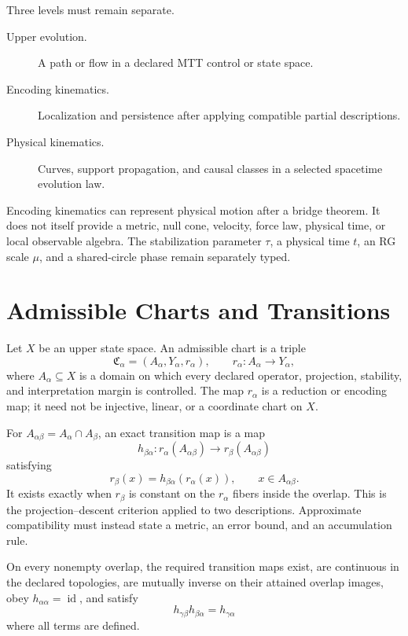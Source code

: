 \documentclass[11pt]{article}
\begin{document}
Three levels must remain separate.
\begin{description}
\item[Upper evolution.] A path or flow in a declared MTT control or state
space.
\item[Encoding kinematics.] Localization and persistence after applying
compatible partial descriptions.
\item[Physical kinematics.] Curves, support propagation, and causal classes
in a selected spacetime evolution law.
\end{description}

Encoding kinematics can represent physical motion after a bridge theorem. It
does not itself provide a metric, null cone, velocity, force law, physical
time, or local observable algebra. The stabilization parameter $\tau$, a
physical time $t$, an RG scale $\mu$, and a shared-circle phase remain
separately typed.

\section{Admissible Charts and Transitions}

Let $X$ be an upper state space. An admissible chart is a triple
\[
 \mathfrak C_\alpha=(A_\alpha,Y_\alpha,r_\alpha),
 \qquad r_\alpha:A_\alpha\longrightarrow Y_\alpha,
\]
where $A_\alpha\subseteq X$ is a domain on which every declared operator,
projection, stability, and interpretation margin is controlled. The map
$r_\alpha$ is a reduction or encoding map; it need not be injective, linear,
or a coordinate chart on $X$.

For $A_{\alpha\beta}=A_\alpha\cap A_\beta$, an exact transition map is a map
\[
 h_{\beta\alpha}:
 r_\alpha(A_{\alpha\beta})\longrightarrow r_\beta(A_{\alpha\beta})
\]
satisfying
\[
 r_\beta(x)=h_{\beta\alpha}(r_\alpha(x)),
 \qquad x\in A_{\alpha\beta}.
\]
It exists exactly when $r_\beta$ is constant on the $r_\alpha$ fibers inside
the overlap. This is the projection--descent criterion applied to two
descriptions. Approximate compatibility must instead state a metric, an error
bound, and an accumulation rule.

\begin{assumption}\label{ass:charts}
On every nonempty overlap, the required transition maps exist, are continuous
in the declared topologies, are mutually inverse on their attained overlap
images, obey $h_{\alpha\alpha}=\operatorname{id}$, and satisfy
\[
 h_{\gamma\beta}h_{\beta\alpha}=h_{\gamma\alpha}
\]
where all terms are defined.
\end{assumption}
\end{document}
